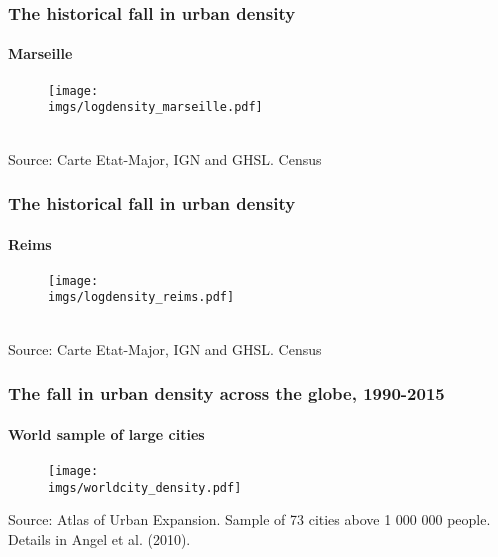 \documentclass[aspectratio=169]{beamer}
\begin{document}
\begin{frame}[label=Marseille]
\frametitle{The historical fall in urban density}
\framesubtitle{Marseille}
\begin{figure}
	\begin{center}
		\texttt{[image: \\imgs/logdensity\_marseille.pdf]}
	\end{center}
\end{figure}
\hyperlink{density}{}\\
{\tiny Source: Carte Etat-Major, IGN and GHSL. Census}
\end{frame}

\begin{frame}[label=Reims]
\frametitle{The historical fall in urban density}
\framesubtitle{Reims}
\begin{figure}
	\begin{center}
		\texttt{[image: \\imgs/logdensity\_reims.pdf]}
	\end{center}
\end{figure}
\hyperlink{density}{}\\
{\tiny Source: Carte Etat-Major, IGN and GHSL. Census}
\end{frame}

\begin{frame}[label=world_sample_city]
\frametitle{The fall in urban density across the globe, 1990-2015}
\framesubtitle{World sample of large cities}
\begin{figure}
	\begin{center}
		\texttt{[image: \\imgs/worldcity\_density.pdf]}
	\end{center}
\end{figure}
{\tiny Source: Atlas of Urban Expansion. Sample of 73 cities above 1 000 000 people. Details in Angel et al. (2010).}\\
\hyperlink{density}{}
\end{frame}

\end{document}

